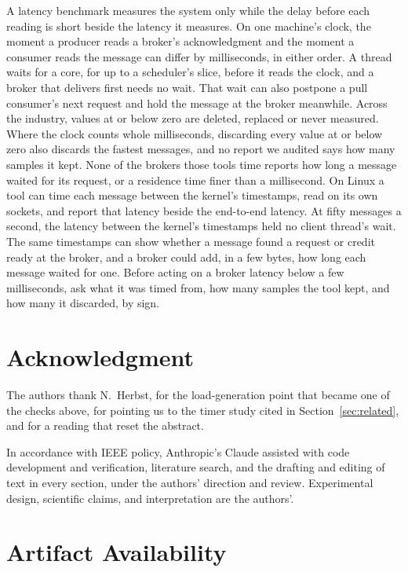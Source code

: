 \documentclass[10pt,journal,compsoc]{IEEEtran}
\begin{document}
A latency benchmark measures the system only while the delay before each reading is short beside
the latency it measures. On one machine's clock, the moment a producer reads a broker's
acknowledgment and the moment a consumer reads the message can differ by milliseconds, in either
order. A thread waits for a core, for up to a scheduler's slice, before it reads the clock, and a
broker that delivers first needs no wait. That wait can also postpone a pull consumer's next
request and hold the message at the broker meanwhile. Across the industry, values at or below zero
are deleted, replaced or never measured. Where the clock counts whole milliseconds, discarding every
value at or below zero also discards the fastest messages, and no report we audited says how many
samples it kept. None of the brokers those tools time reports how long a message waited for its
request, or a residence time finer than a millisecond. On Linux a tool can time each message
between the kernel's timestamps, read on its own sockets, and report that latency beside the
end-to-end latency. At fifty messages a second, the latency between the kernel's timestamps held no
client thread's wait. The same timestamps can show whether a message found a request or credit
ready at the broker, and a broker could add, in a few bytes, how long each message waited for one. Before
acting on a broker latency below a few milliseconds, ask what it
was timed from, how many samples the tool kept, and how many it discarded, by sign.

\section*{Acknowledgment}

The authors thank N.~Herbst, for the load-generation point that became one of the
checks above, for pointing us to the timer study cited in
Section~\ref{sec:related}, and for a reading that reset the abstract.

In accordance with IEEE policy, Anthropic's Claude assisted with code development and
verification, literature search, and the drafting and editing of text in every section, under the
authors' direction and review. Experimental design, scientific claims, and interpretation are the
authors'.

\section*{Artifact Availability}
\end{document}
